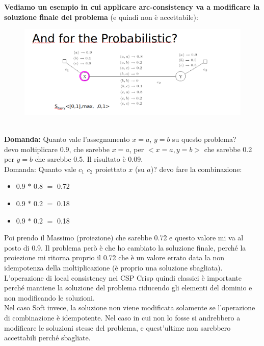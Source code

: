 \noindent \textbf{Vediamo un esempio in cui applicare arc-consistency va a
    modificare la soluzione finale del problema} (e quindi non è accettabile):
\begin{figure}[htp]
    \centering
    \includegraphics[width=14cm, keepaspectratio]{img/Cap5/probabilistc2.png}
\end{figure}
\\
\textbf{Domanda:} Quanto vale l'assegnamento $x = a$, $y = b$ su questo
problema? \\devo moltiplicare 0.9, che sarebbe $x=a$, per $<x = a, y = b>$ che
sarebbe 0.2 per $y = b$ che sarebbe 0.5. Il risultato è 0.09. \\Domanda: Quanto
vale $c_1$ $c_2$ proiettato $x$ (su $a$)? devo fare la combinazione:
\begin{itemize}
    \item 0.9 $*$ 0.8 $=$ 0.72
    \item 0.9 $*$ 0.2 $=$ 0.18
    \item 0.9 $*$ 0.2 $=$ 0.18
\end{itemize}
Poi prendo il Massimo (proiezione) che sarebbe 0.72 e questo valore mi va al
posto di 0.9. Il problema però è che ho cambiato la soluzione finale, perché la
proiezione mi ritorna proprio il 0.72 che è un valore errato data la non
idempotenza della moltiplicazione (è proprio una soluzione sbagliata).\\

L'operazione di local consistency nei CSP Crisp quindi classici è
importante perché mantiene la soluzione del problema riducendo gli elementi del
dominio e non modificando le soluzioni.\\

Nel caso Soft invece, la soluzione non viene modificata solamente se
l'operazione di combinazione è idempotente. Nel caso in cui non lo fosse si
andrebbero a modificare le soluzioni stesse del problema, e quest'ultime non
sarebbero accettabili perché sbagliate.

